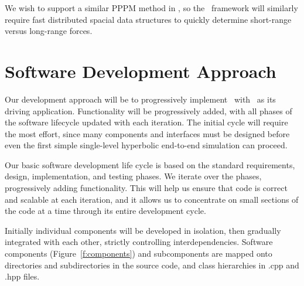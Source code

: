 \documentclass[10pt,twocolumn]{article}
\begin{document}
We wish to support a similar PPPM method in \enzoii, so the \cello\
framework will similarly require fast distributed spacial data
structures to quickly determine short-range versus long-range forces.


\section{Software Development Approach} \label{s:develop} 




Our development approach will be to progressively implement \cello\ with
\enzoii\ as its driving application.  Functionality will be
progressively added, with all phases of the software lifecycle updated
with each iteration.  The initial cycle will require the most effort,
since many components and interfaces must be designed before even the
first simple single-level hyperbolic end-to-end simulation can
proceed.

Our basic software development life cycle is based on the standard
requirements, design, implementation, and testing phases.  We iterate
over the phases, progressively adding functionality.  This will help
us ensure that code is correct and scalable at each iteration, and it
allows us to concentrate on small sections of the code at a time
through its entire development cycle.  

Initially individual components will be developed in isolation, then
gradually integrated with each other, strictly controlling
interdependencies.  Software components (Figure~\ref{f:components})
and subcomponents are mapped onto directories and subdirectories in
the source code, and class hierarchies in .cpp and .hpp files.
\end{document}
